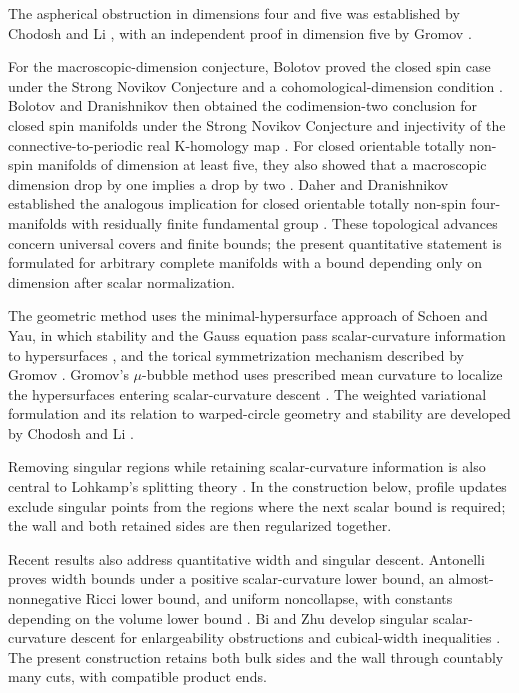 The aspherical obstruction in dimensions four and five was established
by Chodosh and Li \citep[Theorem~2]{chodoshLi}, with an independent
proof in dimension five by Gromov
\citep[\S7, Main Corollary]{gromov2020Aspherical}.

For the macroscopic-dimension conjecture, Bolotov proved the closed spin
case under the Strong Novikov Conjecture and a cohomological-dimension condition
\citep{bolotov2009}. Bolotov and Dranishnikov then obtained the
codimension-two conclusion for closed spin manifolds under the
Strong Novikov Conjecture and
injectivity of the connective-to-periodic real K-homology map
\citep[Theorem~4.3]{bolotovDranishnikov2010}.
For closed orientable totally non-spin manifolds of dimension at least
five, they also showed that a macroscopic dimension drop by one implies
a drop by two \citep[Theorem~3.4]{bolotovDranishnikov2016}.
Daher and Dranishnikov established the analogous implication for closed
orientable totally non-spin four-manifolds with residually finite
fundamental group
\citep[Theorem~3.3]{daherDranishnikov2019}.
These topological advances concern universal covers and finite bounds;
the present quantitative statement is formulated for arbitrary complete
manifolds with a bound depending only on dimension after scalar normalization.


The geometric method uses the minimal-hypersurface approach of Schoen
and Yau, in which stability and the Gauss equation pass scalar-curvature
information to hypersurfaces \citep[Section~1]{schoenYau1979Structure},
and the torical symmetrization mechanism described by Gromov
\citep[Section~2]{gromov2018Metric}. Gromov's \(\mu\)-bubble method
uses prescribed mean curvature to localize the hypersurfaces entering
scalar-curvature descent \citep[\S\(5\frac56\)]{gromov1996}.
The weighted variational formulation and its relation to warped-circle
geometry and stability are developed by Chodosh and Li
\citep[Section~3 and Remark~11]{chodoshLi}.

Removing singular regions while retaining scalar-curvature information
is also central to Lohkamp's splitting theory
\citep[\S1.2 and Theorem~3.15]{lohkamp2022SplittingsII}.
In the construction below, profile updates exclude singular points from
the regions where the next scalar bound is required; the wall and both
retained sides are then regularized together.

Recent results also address quantitative width and singular descent.
Antonelli proves width bounds under a positive scalar-curvature lower
bound, an almost-nonnegative Ricci lower bound, and uniform noncollapse,
with constants depending on the volume lower bound
\citep[Theorem~1.4]{antonelli2026Volume}.
Bi and Zhu develop singular scalar-curvature descent for enlargeability
obstructions and cubical-width inequalities
\citep[Theorem~B and Section~4]{biZhu2026}.
The present construction retains both bulk sides and the wall through
countably many cuts, with compatible product ends.

